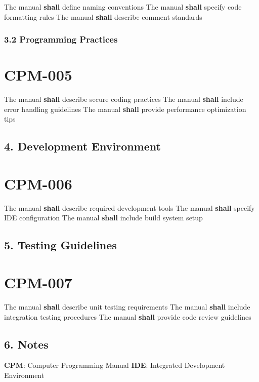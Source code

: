 The manual \textbf{shall} define naming conventions
The manual \textbf{shall} specify code formatting rules
The manual \textbf{shall} describe comment standards

\subsubsection{3.2 Programming Practices}

\section{CPM-005}\label{CPM-005}

The manual \textbf{shall} describe secure coding practices
The manual \textbf{shall} include error handling guidelines
The manual \textbf{shall} provide performance optimization tips

\subsection{4. Development Environment}

\section{CPM-006}\label{CPM-006}

The manual \textbf{shall} describe required development tools
The manual \textbf{shall} specify IDE configuration
The manual \textbf{shall} include build system setup

\subsection{5. Testing Guidelines}

\section{CPM-007}\label{CPM-007}

The manual \textbf{shall} describe unit testing requirements
The manual \textbf{shall} include integration testing procedures
The manual \textbf{shall} provide code review guidelines

\subsection{6. Notes}
\textbf{CPM}: Computer Programming Manual
\textbf{IDE}: Integrated Development Environment

